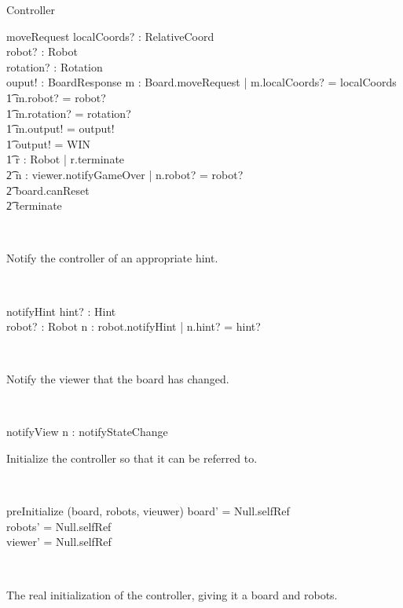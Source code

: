 \documentclass[12pt]{article}
\begin{document}
\begin{class}{Controller}
\begin{schema}{moveRequest}
localCoords? : RelativeCoord \\
robot? : Robot \\
rotation? : Rotation \\
ouput! : BoardResponse
\where
\exists m : Board.moveRequest | m.localCoords? = localCoords \\ \t1
m.robot? = robot? \\ \t1
m.rotation? = rotation? \\ \t1
m.output! = output! \\ \t1
\IF output! = WIN \\ \t1
\THEN \forall r : Robot | r.terminate \\ \t2
\exists n : viewer.notifyGameOver | n.robot? = robot? \\ \t2
board.canReset \\ \t2
terminate
\end{schema}\\
\begin{classcom}
Notify the controller of an appropriate hint.
\end{classcom} \\
\begin{schema}{notifyHint}
hint? : Hint \\
robot? : Robot
\where
\exists n : robot.notifyHint | n.hint? = hint?
\end{schema}\\
\begin{classcom}
Notify the viewer that the board has changed.
\end{classcom} \\
\begin{schema}{notifyView}
\where
\exists n : notifyStateChange
\end{schema}
\znewpage
\begin{classcom}
Initialize the controller so that it can be referred to.
\end{classcom} \\
\begin{schema}{preInitialize}
\Delta (board, robots, vieuwer)
\where
board' = Null.selfRef \\
robots' = Null.selfRef \\
viewer' = Null.selfRef
\end{schema}\\
\begin{classcom}
The real initialization of the controller, giving it a board and robots.
\end{classcom} \\

\end{class}
\end{document}
